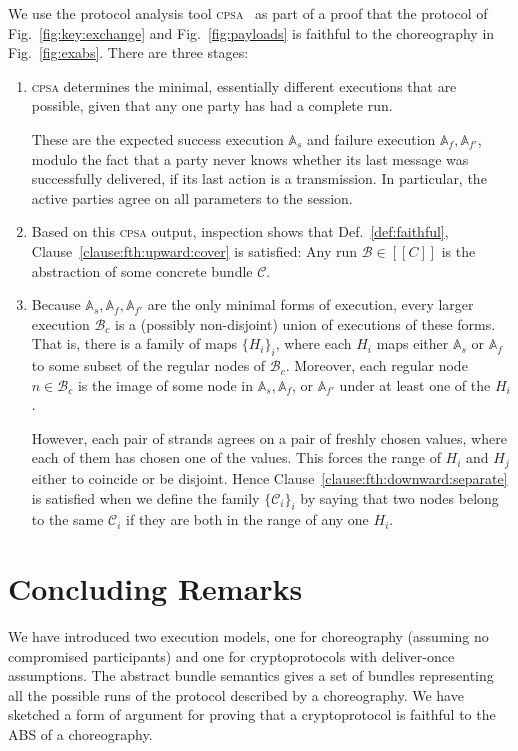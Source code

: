 \documentclass[copyright]{eptcs}
\newcommand{\skel}{\ensuremath{\mathbb{A}}}
\newcommand{\bnd}{\mathcal{B}}
\newcommand{\bndC}{\mathcal{C}}
\newcommand{\sembrack}[1]{[\![#1]\!]}
\newcommand{\NI}{\noindent}
\begin{document}
\NI {\bf Faithfulness in the Buyer-Seller protocol.} We use the
protocol analysis tool \textsc{cpsa}~\cite{DoghmiGuttmanThayer07} as
part of a proof that the protocol of Fig.~\ref{fig:key:exchange} and
Fig.~\ref{fig:payloads} is faithful to the choreography in
Fig.~\ref{fig:exabs}.  There are three stages:
\begin{enumerate}
  \item \textsc{cpsa} determines the minimal, essentially different
  executions that are possible, given that any one party has had a
  complete run.  

  These are the expected success execution $\skel_s$ and failure
  execution $\skel_f, \skel_{f'}$, modulo the fact that a party never
  knows whether its last message was successfully delivered, if its
  last action is a transmission.  In particular, the active parties
  agree on all parameters to the session.
  \item Based on this \textsc{cpsa} output, inspection shows that
  Def.~\ref{def:faithful}, Clause~\ref{clause:fth:upward:cover} is
  satisfied:  Any run $\bnd\in\sembrack{C}$ is the abstraction of some
  concrete bundle $\bndC$.
  \item Because $\skel_s,\skel_f,\skel_{f'}$ are the only minimal
  forms of execution, every larger execution $\bnd_c$ is a (possibly
  non-disjoint) union of executions of these forms.  That is, there is
  a family of maps $\{H_i\}_i$, where each $H_i$ maps either $\skel_s$
  or $\skel_f$ to some subset of the regular nodes of $\bnd_c$.
  Moreover, each regular node $n\in\bnd_c$ is the image of some node
  in $\skel_s,\skel_f$, or $\skel_{f'}$ under at least one of the
  $H_i$.

  However, each pair of strands agrees on a pair of freshly chosen
  values, where each of them has chosen one of the values.  This
  forces the range of $H_i$ and $H_j$ either to coincide or be
  disjoint.  Hence Clause~\ref{clause:fth:downward:separate} is
  satisfied when we define the family $\{\bndC_i\}_i$ by saying that
  two nodes belong to the same $\bndC_i$ if they are both in the range
  of any one $H_i$.    
\end{enumerate}






\section{Concluding Remarks}
We have introduced two execution models, one for choreography
(assuming no compromised participants) and one for cryptoprotocols
with deliver-once assumptions.  The abstract bundle semantics gives a
set of bundles representing all the possible runs of the protocol
described by a choreography.  We have sketched a form of argument for
proving that a cryptoprotocol is faithful to the ABS of a
choreography.
\end{document}
